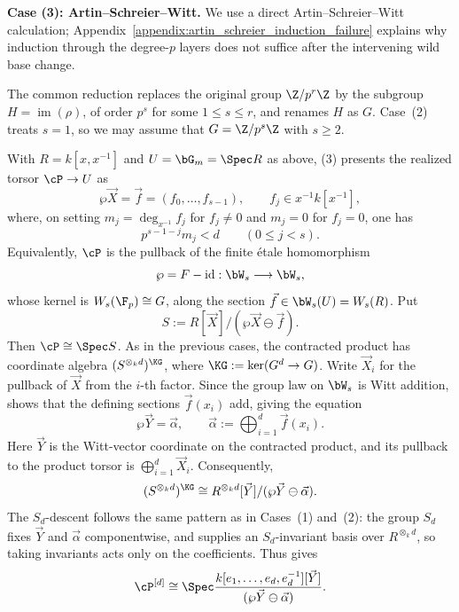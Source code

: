 \medskip
\noindent\textbf{Case (3): Artin--Schreier--Witt.}
We use a direct Artin--Schreier--Witt calculation;
Appendix~\ref{appendix:artin_schreier_induction_failure} explains why
induction through the degree-$p$ layers does not suffice after the intervening
wild base change.

The common reduction replaces the original group $\Z/p^r\Z$ by the subgroup
$H=\operatorname{im}(\rho)$, of order $p^s$ for some $1\leq s\leq r$, and
renames $H$ as $G$. Case~(2) treats $s=1$, so we may assume that
$G=\Z/p^s\Z$ with $s\geq2$.

With $R=k[x,x^{-1}]$ and $U=\bG_m=\Spec R$ as above,
(3) presents the realized torsor
$\cP\to U$ as
\[
    \wp\vec X=\vec f=(f_0,\dots,f_{s-1}),
    \qquad f_j\in x^{-1}k[x^{-1}],
\]
where, on setting $m_j=\deg_{x^{-1}}f_j$ for $f_j\ne0$ and $m_j=0$ for
$f_j=0$, one has
\[
    p^{s-1-j}m_j<d\qquad(0\leq j<s).
\]
Equivalently, $\cP$ is the pullback of the finite \'etale homomorphism
\[
    \wp=F-\mathrm{id}:\bW_s\longrightarrow\bW_s,
\]
whose kernel is $W_s(\F_p)\cong G$, along the section
$\vec f\in\bW_s(U)=W_s(R)$. Put
\[
    S:=R[\vec X]/(\wp\vec X\ominus\vec f).
\]
Then $\cP\cong\Spec S$. As in the previous cases, the contracted product has
coordinate algebra $(S^{\otimes_k d})^{\KG}$, where
$\KG:=\ker(G^d\to G)$. Write
$\vec X_i$ for the pullback of $\vec X$ from the $i$-th factor. Since the
group law on $\bW_s$ is Witt addition,
 shows that the defining sections
$\vec f(x_i)$ add, giving the equation
\[
    \wp\vec Y=\vec\alpha,
    \qquad
    \vec\alpha:=\bigoplus_{i=1}^d\vec f(x_i).
\]
Here $\vec Y$ is the Witt-vector coordinate on the contracted product, and
its pullback to the product torsor is
$\bigoplus_{i=1}^d\vec X_i$. Consequently,
\[
    (S^{\otimes_k d})^{\KG}
       \cong
    R^{\otimes_k d}[\vec Y]/(\wp\vec Y\ominus\vec\alpha).
\]
The $S_d$-descent follows the same pattern as in Cases~(1) and~(2): the group
$S_d$ fixes $\vec Y$ and $\vec\alpha$ componentwise, and
 supplies an $S_d$-invariant basis over
$R^{\otimes_k d}$, so taking invariants acts only on the coefficients. Thus
 gives
\[
    \cP^{[d]}\cong
    \Spec\frac{k[e_1,\dots,e_d,e_d^{-1}][\vec Y]}
                   {(\wp\vec Y\ominus\vec\alpha)}.
\]

